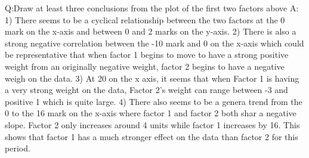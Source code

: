 \documentclass[]{article}
\begin{document}
Q:Draw at least three conclusions from the plot of the first two factors
above A: 1) There seems to be a cyclical relationship between the two
factors at the 0 mark on the x-axis and between 0 and 2 marks on the
y-axis. 2) There is also a strong negative correlation between the -10
mark and 0 on the x-axis which could be representative that when factor
1 begins to move to have a strong positive weight from an originally
negative weight, factor 2 begins to have a negative weigh on the data.
3) At 20 on the x axis, it seems that when Factor 1 is having a very
strong weight on the data, Factor 2's weight can range between -3 and
positive 1 which is quite large. 4) There also seems to be a genera
trend from the 0 to the 16 mark on the x-axis where factor 1 and factor
2 both shar a negative slope. Factor 2 only increases around 4 units
while factor 1 increases by 16. This shows that factor 1 has a much
stronger effect on the data than factor 2 for this period.
\end{document}
